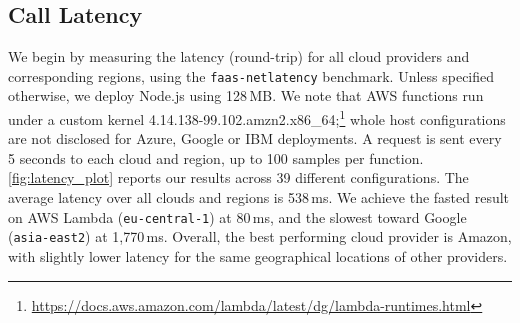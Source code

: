 \subsection{Call Latency}
We begin by measuring the latency (round-trip) for all cloud providers and corresponding regions, using the \texttt{faas-netlatency} benchmark.
Unless specified otherwise, we deploy Node.js using 128\,\gls{MB}.
We note that AWS functions run under a custom kernel 4.14.138-99.102.amzn2.x86\_64;\footnote{\url{https://docs.aws.amazon.com/lambda/latest/dg/lambda-runtimes.html}} 
whole host configurations are not disclosed for Azure, Google or IBM deployments.
A request is sent every 5 seconds to each cloud and region, up to 100 samples per function.
\autoref{fig:latency_plot} reports our results across 39 different configurations. 
The average latency over all clouds and regions is 538\,ms.
We achieve the fasted result on AWS Lambda (\texttt{eu-central-1}) at 80\,ms, and the slowest toward Google (\texttt{asia-east2}) at 1,770\,ms. 
Overall, the best performing cloud provider is Amazon, with slightly lower latency for the same geographical locations of other providers.

